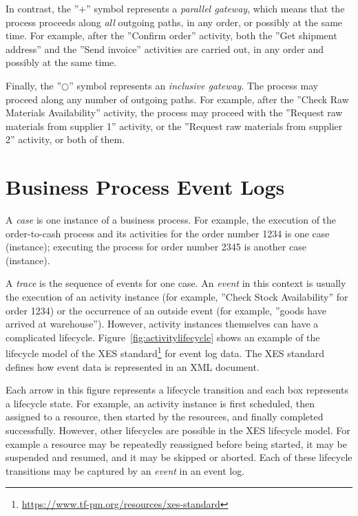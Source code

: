 In contrast, the ''$+$'' symbol represents a \emph{parallel gateway}, which means that the process proceeds along \emph{all} outgoing paths, in any order, or possibly at the same time. For example, after the ''Confirm order'' activity, both the ''Get shipment address'' and the ''Send invoice'' activities are carried out, in any order and possibly at the same time.

Finally, the ''$\bigcirc$'' symbol represents an \emph{inclusive gateway}. The process may proceed along any number of outgoing paths. For example, after the ''Check Raw Materials Availability'' activity, the process may proceed with the ''Request raw materials from supplier 1'' activity, or the ''Request raw materials from supplier 2'' activity, or both of them.

\section{Business Process Event Logs}

A \emph{case} is one instance of a business process. For example, the execution of the order-to-cash process and its activities for the order number 1234 is one case (instance); executing the process for order number 2345 is another case (instance). 

A \emph{trace} is the sequence of events for one case. An \emph{event} in this context is usually the execution of an activity instance (for example, ''Check Stock Availability'' for order 1234) or the occurrence of an outside event (for example, ''goods have arrived at warehouse''). However, activity instances themselves can have a complicated lifecycle. Figure~\ref{fig:activitylifecycle} shows an example of the lifecycle model of the XES standard\footnote{\url{https://www.tf-pm.org/resources/xes-standard}} for event log data. The XES standard defines how event data is represented in an XML document.

Each arrow in this figure represents a lifecycle transition and each box represents a lifecycle state. For example, an activity instance is first scheduled, then assigned to a resource, then started by the resources, and finally completed successfully. However, other lifecycles are possible in the XES lifecycle model. For example a resource may be repeatedly reassigned before being started, it may be suspended and resumed, and it may be skipped or aborted. Each of these lifecycle transitions may be captured by an \emph{event} in an event log.


